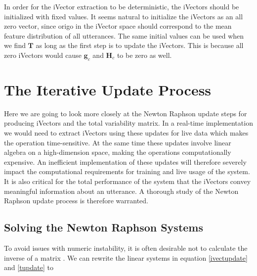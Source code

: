 In order for the iVector extraction to be deterministic, the iVectors should be initialized with fixed values. It seems natural to initialize the iVectors as an all zero vector, since origo in the iVector space should correspond to the mean feature distribution of all utterances. The same initial values can be used when we find $\mathbf{T}$ as long as the first step is to update the iVectors. This is because all zero iVectors would cause $\mathbf{g}_c$ and $\mathbf{H}_c$ to be zero as well.

\section{The Iterative Update Process}
\label{sect:deeperivect}

Here we are going to look more closely at the Newton Raphson update steps for producing iVectors and the total variability matrix. In a real-time implementation we would need to extract iVectors using these updates for live data which makes the operation time-sensitive. At the same time these updates involve linear algebra on a high-dimension space, making the operations computationally expensive. An inefficient implementation of these updates will therefore severely impact the computational requirements for training and live usage of the system. It is also critical for the total performance of the system that the iVectors convey meaningful information about an utterance. A thorough study of the Newton Raphson update process is therefore warranted. 

\subsection{Solving the Newton Raphson Systems}
\label{sect:solvivect}

To avoid issues with numeric instability, it is often desirable not to calculate the inverse of a matrix \cite[p. 743]{cormen}. We can rewrite the linear systems in equation \ref{ivectupdate} and \ref{tupdate} to

